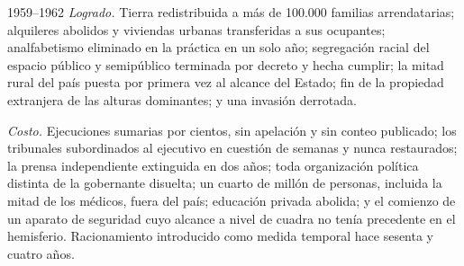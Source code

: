 \begin{ledger}{1959--1962}
\emph{Logrado.} Tierra redistribuida a más de 100.000 familias arrendatarias;
alquileres abolidos y viviendas urbanas transferidas a sus ocupantes;
analfabetismo eliminado en la práctica en un solo año; segregación racial del
espacio público y semipúblico terminada por decreto y hecha cumplir; la mitad
rural del país puesta por primera vez al alcance del Estado; fin de la propiedad
extranjera de las alturas dominantes; y una invasión derrotada.

\emph{Costo.} Ejecuciones sumarias por cientos, sin apelación y sin conteo
publicado; los tribunales subordinados al ejecutivo en cuestión de semanas y
nunca restaurados; la prensa independiente extinguida en dos años; toda
organización política distinta de la gobernante disuelta; un cuarto de millón de
personas, incluida la mitad de los médicos, fuera del país; educación privada
abolida; y el comienzo de un aparato de seguridad cuyo alcance a nivel de cuadra
no tenía precedente en el hemisferio. Racionamiento introducido como medida
temporal hace sesenta y cuatro años.
\end{ledger}
